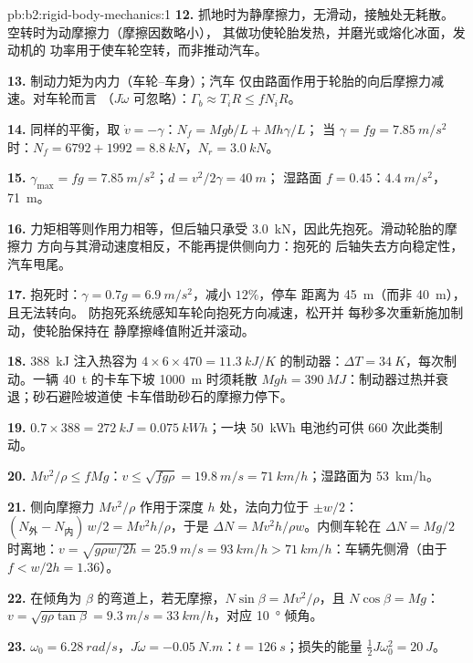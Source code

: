 \begin{solution}{pb:b2:rigid-body-mechanics:1}
\textbf{12.} 抓地时为静摩擦力，无滑动，接触处无耗散。
空转时为动摩擦力（摩擦因数略小），
其做功使轮胎发热，并磨光或熔化冰面，发动机的
功率用于使车轮空转，而非推动汽车。

\textbf{13.} 制动力矩为内力（车轮–车身）；汽车
仅由路面作用于轮胎的向后摩擦力减速。对车轮而言
（$J\dot\omega$ 可忽略）：$\Gamma_b \approx T_iR \le fN_iR$。

\textbf{14.} 同样的平衡，取 $\dot v = -\gamma$：$N_f = Mgb/L + Mh\gamma/L$；
当 $\gamma = fg = \qty{7.85}{m/s^2}$ 时：$N_f = 6792 + 1992 = \qty{8.8}{kN}$，$N_r =
\qty{3.0}{kN}$。

\textbf{15.} $\gamma_{\max} = fg = \qty{7.85}{m/s^2}$；$d = v^2/2\gamma = \qty{40}{m}$；
湿路面 $f = 0.45$：$\qty{4.4}{m/s^2}$，\qty{71}{m}。

\textbf{16.} 力矩相等则作用力相等，但后轴只承受
\qty{3.0}{kN}，因此先抱死。滑动轮胎的摩擦力
方向与其滑动速度相反，不能再提供侧向力：抱死的
后轴失去方向稳定性，汽车甩尾。

\textbf{17.} 抱死时：$\gamma = 0.7g = \qty{6.9}{m/s^2}$，减小 $12\%$，停车
距离为 \qty{45}{m}（而非 \qty{40}{m}），且无法转向。
防抱死系统感知车轮向抱死方向减速，松开并
每秒多次重新施加制动，使轮胎保持在
静摩擦峰值附近并滚动。

\textbf{18.} \qty{388}{kJ} 注入热容为 $4 \times 6 \times 470 = \qty{11.3}{kJ/K}$ 的制动器：$\Delta T =
\qty{34}{K}$，每次制动。一辆 \qty{40}{t} 的卡车下坡 \qty{1000}{m} 时须耗散
$Mgh = \qty{390}{MJ}$：制动器过热并衰退；砂石避险坡道使
卡车借助砂石的摩擦力停下。

\textbf{19.} $0.7 \times 388 = \qty{272}{kJ} = \qty{0.075}{kWh}$；一块 \qty{50}{kWh}
电池约可供 $660$ 次此类制动。

\textbf{20.} $Mv^2/\rho \le fMg$：$v \le \sqrt{fg\rho} = \qty{19.8}{m/s} =
\qty{71}{km/h}$；湿路面为 \qty{53}{km/h}。

\textbf{21.} 侧向摩擦力 $Mv^2/\rho$ 作用于深度 $h$ 处，法向力位于
$\pm w/2$：$(N_{\text{外}} - N_{\text{内}})\,w/2 = Mv^2h/\rho$，于是 $\Delta N =
Mv^2h/\rho w$。内侧车轮在 $\Delta N = Mg/2$ 时离地：$v = \sqrt{g\rho w/2h} =
\qty{25.9}{m/s} = \qty{93}{km/h} > \qty{71}{km/h}$：车辆先侧滑（由于 $f <
w/2h = 1.36$）。

\textbf{22.} 在倾角为 $\beta$ 的弯道上，若无摩擦，$N\sin\beta =
Mv^2/\rho$，且 $N\cos\beta = Mg$：$v = \sqrt{g\rho\tan\beta} = \qty{9.3}{m/s} =
\qty{33}{km/h}$，对应 \qty{10}{\degree} 倾角。

\textbf{23.} $\omega_0 = \qty{6.28}{rad/s}$，$J\dot\omega = \qty{-0.05}{N.m}$：$t =
\qty{126}{s}$；损失的能量 $\tfrac12J\omega_0^2 = \qty{20}{J}$。


\end{solution}
